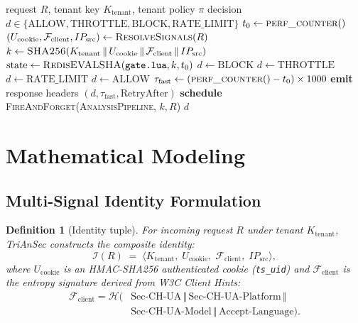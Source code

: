 \documentclass[journal,10pt]{IEEEtran}
\newtheorem{definition}{Definition}
\newcommand{\Fclient}{\mathcal{F}_{\mathrm{client}}}
\newcommand{\Ktenant}{K_{\mathrm{tenant}}}
\newcommand{\Ucookie}{U_{\mathrm{cookie}}}
\newcommand{\Tfast}{\tau_{\mathrm{fast}}}
\newcommand{\ip}{IP_{\mathrm{src}}}
\begin{document}
\begin{algorithm}[!t]
\caption{TriAnSec Fast-Path Decision Gate}
\label{alg:fastpath}
\begin{algorithmic}[1]
\Require request $R$, tenant key $\Ktenant$, tenant policy $\pi$
\Ensure decision $d\in\{\mathrm{ALLOW},\mathrm{THROTTLE},\mathrm{BLOCK},\mathrm{RATE\_LIMIT}\}$
\State $t_0 \gets \textsc{perf\_counter}()$
\State $(\Ucookie, \Fclient, \ip) \gets \textsc{ResolveSignals}(R)$
\State $k \gets \textsc{SHA256}(\Ktenant \,\|\, \Ucookie \,\|\, \Fclient \,\|\, \ip)$
\State $\text{state} \gets \textsc{RedisEVALSHA}(\texttt{gate.lua}, k, t_0)$
    \State $d \gets \mathrm{BLOCK}$
    \State $d \gets \mathrm{THROTTLE}$
    \State $d \gets \mathrm{RATE\_LIMIT}$
\Else
    \State $d \gets \mathrm{ALLOW}$
\EndIf
\State $\Tfast \gets (\textsc{perf\_counter}() - t_0) \times 1000$
\State \textbf{emit} response headers $(d, \Tfast, \mathrm{RetryAfter})$
\State \textbf{schedule} \textsc{FireAndForget}(\textsc{AnalysisPipeline}, $k, R$)
\State \Return $d$
\end{algorithmic}
\end{algorithm}

\section{Mathematical Modeling}
\label{sec:math}

\subsection{Multi-Signal Identity Formulation}
\begin{definition}[Identity tuple]
For incoming request $R$ under tenant $\Ktenant$, TriAnSec constructs the composite identity:
\begin{equation}
\mathcal{I}(R) \;=\; \langle \Ktenant,\; \Ucookie,\; \Fclient,\; \ip \rangle,
\end{equation}
where $\Ucookie$ is an HMAC-SHA256 authenticated cookie (\texttt{ts\_uid}) and $\Fclient$ is the entropy signature derived from W3C Client Hints:
\begin{equation}
\begin{aligned}
\Fclient = \mathcal{H}\bigl(&\text{Sec-CH-UA} \,\Vert\, \text{Sec-CH-UA-Platform} \,\Vert\\
&\text{Sec-CH-UA-Model} \,\Vert\, \text{Accept-Language}\bigr).
\end{aligned}
\end{equation}
\end{definition}
\end{document}
